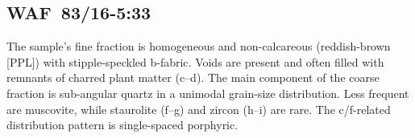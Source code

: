 \documentclass[a4paper]{article}
\begin{document}
\newpage\subsection{WAF~83/16-5:33 \citep[waf\#96; Fig.~\ref{fig:wafmon.pottery}.5; Bekongo style;][503 Pl.~69.5]{Wotzka.1995}}

\begin{multicols}{2}
\noindent The sample's fine fraction is homogeneous and non-calcareous (reddish-brown [PPL]) with stipple-speckled b-fabric. Voids are present and often filled with remnants of charred plant matter (c--d). The main component of the coarse fraction is sub-angular quartz in a unimodal grain-size distribution. Less frequent are muscovite, while staurolite (f--g) and zircon (h--i) are rare. The c/f-related distribution pattern is single-spaced porphyric.

\end{multicols}
\end{document}
